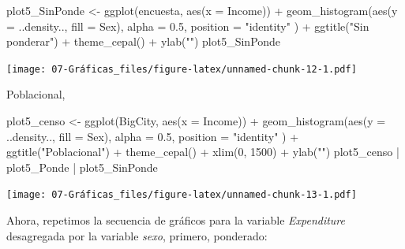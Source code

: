 \documentclass[
  12pt,
]{book}
\newenvironment{Shaded}{\begin{snugshade}}{\end{snugshade}}
\newcommand{\AttributeTok}[1]{\textcolor[rgb]{0.77,0.63,0.00}{#1}}
\newcommand{\DecValTok}[1]{\textcolor[rgb]{0.00,0.00,0.81}{#1}}
\newcommand{\FloatTok}[1]{\textcolor[rgb]{0.00,0.00,0.81}{#1}}
\newcommand{\FunctionTok}[1]{\textcolor[rgb]{0.00,0.00,0.00}{#1}}
\newcommand{\NormalTok}[1]{#1}
\newcommand{\OtherTok}[1]{\textcolor[rgb]{0.56,0.35,0.01}{#1}}
\newcommand{\SpecialCharTok}[1]{\textcolor[rgb]{0.00,0.00,0.00}{#1}}
\newcommand{\StringTok}[1]{\textcolor[rgb]{0.31,0.60,0.02}{#1}}
\begin{document}
\begin{Shaded}
\begin{Highlighting}[]
\NormalTok{plot5\_SinPonde }\OtherTok{\textless{}{-}} \FunctionTok{ggplot}\NormalTok{(encuesta, }\FunctionTok{aes}\NormalTok{(}\AttributeTok{x =}\NormalTok{ Income)) }\SpecialCharTok{+}
  \FunctionTok{geom\_histogram}\NormalTok{(}\FunctionTok{aes}\NormalTok{(}\AttributeTok{y =}\NormalTok{ ..density.., }\AttributeTok{fill =}\NormalTok{ Sex),}
    \AttributeTok{alpha =} \FloatTok{0.5}\NormalTok{, }\AttributeTok{position =} \StringTok{"identity"}
\NormalTok{  ) }\SpecialCharTok{+}
  \FunctionTok{ggtitle}\NormalTok{(}\StringTok{"Sin ponderar"}\NormalTok{) }\SpecialCharTok{+}
  \FunctionTok{theme\_cepal}\NormalTok{() }\SpecialCharTok{+}
  \FunctionTok{ylab}\NormalTok{(}\StringTok{""}\NormalTok{)}
\NormalTok{plot5\_SinPonde}
\end{Highlighting}
\end{Shaded}

\texttt{[image: 07-Gráficas\_files/figure-latex/unnamed-chunk-12-1.pdf]}

Poblacional,

\begin{Shaded}
\begin{Highlighting}[]
\NormalTok{plot5\_censo }\OtherTok{\textless{}{-}} \FunctionTok{ggplot}\NormalTok{(BigCity, }\FunctionTok{aes}\NormalTok{(}\AttributeTok{x =}\NormalTok{ Income)) }\SpecialCharTok{+}
  \FunctionTok{geom\_histogram}\NormalTok{(}\FunctionTok{aes}\NormalTok{(}\AttributeTok{y =}\NormalTok{ ..density.., }\AttributeTok{fill =}\NormalTok{ Sex),}
    \AttributeTok{alpha =} \FloatTok{0.5}\NormalTok{, }\AttributeTok{position =} \StringTok{"identity"}
\NormalTok{  ) }\SpecialCharTok{+}
  \FunctionTok{ggtitle}\NormalTok{(}\StringTok{"Poblacional"}\NormalTok{) }\SpecialCharTok{+}
  \FunctionTok{theme\_cepal}\NormalTok{() }\SpecialCharTok{+}
  \FunctionTok{xlim}\NormalTok{(}\DecValTok{0}\NormalTok{, }\DecValTok{1500}\NormalTok{) }\SpecialCharTok{+}
  \FunctionTok{ylab}\NormalTok{(}\StringTok{""}\NormalTok{)}
\NormalTok{plot5\_censo }\SpecialCharTok{|}\NormalTok{ plot5\_Ponde }\SpecialCharTok{|}\NormalTok{ plot5\_SinPonde}
\end{Highlighting}
\end{Shaded}

\texttt{[image: 07-Gráficas\_files/figure-latex/unnamed-chunk-13-1.pdf]}

Ahora, repetimos la secuencia de gráficos para la variable \emph{Expenditure} desagregada por la variable \emph{sexo}, primero, ponderado:
\end{document}
